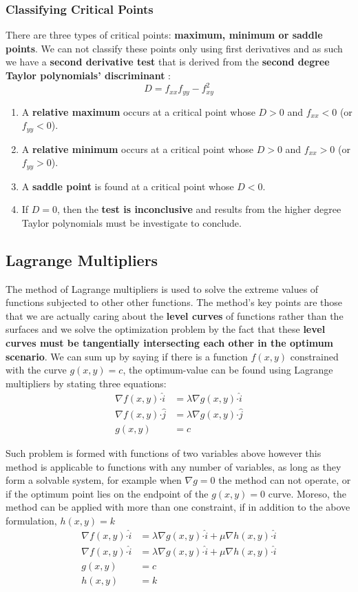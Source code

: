 \documentclass[12pt]{article}
\newcommand{\dotp}{{\boldsymbol \cdot}}
\begin{document}
\subsubsection{Classifying Critical Points}
There are three types of critical points: \textbf{maximum, minimum or saddle points}. We can not classify these points only using first derivatives and as such we have a \textbf{second derivative test} that is derived from the \textbf{second degree Taylor polynomials' discriminant} :
$$D = f_{xx}f_{yy}-f_{xy}^2$$
\begin{enumerate}
\item A \textbf{relative maximum} occurs at a critical point whose $D>0$ and $f_{xx}<0$ (or $f_{yy}<0$).
\item A \textbf{relative minimum} occurs at a critical point whose $D>0$ and $f_{xx}>0$ (or $f_{yy}>0$).
\item A \textbf{saddle point} is found at a critical point whose $D<0$.
\item If $D=0$, then the \textbf{test is inconclusive} and results from the higher degree Taylor polynomials must be investigate to conclude.

\end{enumerate}
\subsection{Lagrange Multipliers}
The method of Lagrange multipliers is used to solve the extreme values of functions subjected to other other functions. The method's key points are those that we are actually caring about the \textbf{level curves} of functions rather than the surfaces and we solve the optimization problem by the fact that these \textbf{level curves must be tangentially intersecting each other in the optimum scenario}. We can sum up by saying if there is a function $f(x,y)$ constrained with the curve $g(x,y)=c$, the optimum-value can be found using Lagrange multipliers by stating three equations:
\begin{align}
	\nabla f(x,y) \dotp \hat i &=\lambda \nabla g(x,y) \dotp \hat i \\
	\nabla f(x,y) \dotp \hat j &=\lambda \nabla g(x,y) \dotp \hat j \\
	g(x,y)&=c
\end{align}

Such problem is formed with functions of two variables above however this method is applicable to functions with any number of variables, as long as they form a solvable system, for example when $\nabla g =0$ the method can not operate, or if the optimum point lies on the endpoint of the $g(x,y)=0$ curve. Moreso, the method can be applied with more than one constraint, if in addition to the above formulation, $h(x,y)=k$
\begin{align}
	\nabla f(x,y) \dotp \hat i &=\lambda \nabla g(x,y) \dotp \hat i + \mu \nabla h(x,y) \dotp \hat i \\
	\nabla f(x,y) \dotp \hat i &=\lambda \nabla g(x,y) \dotp \hat i + \mu \nabla h(x,y) \dotp \hat i \\
	g(x,y)&=c\\
	h(x,y)&=k
\end{align}
\end{document}
